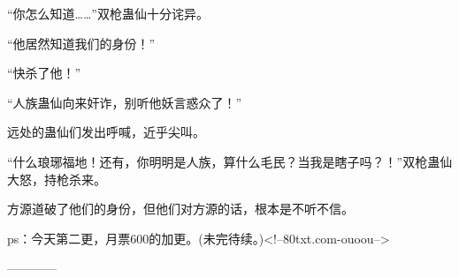 \begin{this_body}
“你怎么知道……”双枪蛊仙十分诧异。

“他居然知道我们的身份！”

“快杀了他！”

“人族蛊仙向来奸诈，别听他妖言惑众了！”

远处的蛊仙们发出呼喊，近乎尖叫。

“什么琅琊福地！还有，你明明是人族，算什么毛民？当我是瞎子吗？！”双枪蛊仙大怒，持枪杀来。

方源道破了他们的身份，但他们对方源的话，根本是不听不信。

ps：今天第二更，月票600的加更。(未完待续。)<!--80txt.com-ouoou-->

------------

\end{this_body}

